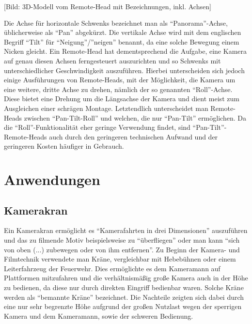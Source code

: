 \documentclass[a4paper, 12pt, bibtotocnumbered, liststotocnumbered]{scrartcl}
\begin{document}
	[Bild: 3D-Modell vom Remote-Head mit Bezeichnungen, inkl. Achsen]

	Die Achse für horizontale Schwenks bezeichnet man als “Panorama”-Achse, üblicherweise als “Pan” abgekürzt. Die vertikale Achse wird mit dem englischen Begriff “Tilt” für “Neigung”/”neigen” benannt, da eine solche Bewegung einem Nicken gleicht.
	Ein Remote-Head hat dementsprechend die Aufgabe, eine Kamera auf genau diesen Achsen ferngesteuert auszurichten und so Schwenks mit unterschiedlicher Geschwindigkeit auszuführen. Hierbei unterscheiden sich jedoch einige Ausführungen von Remote-Heads, mit der Möglichkeit, die Kamera um eine weitere, dritte Achse zu drehen, nämlich der so genannten “Roll”-Achse. Diese bietet eine Drehung um die Längsachse der Kamera und dient meist zum Ausgleichen einer schrägen Montage. Letztendlich unterscheidet man Remote-Heads zwischen “Pan-Tilt-Roll” und welchen, die nur “Pan-Tilt” ermöglichen. Da die “Roll”-Funktionalität eher geringe Verwendung findet, sind “Pan-Tilt”-Remote-Heads auch durch den geringeren technischen Aufwand und der geringeren Kosten häufiger in Gebrauch.

	\section{Anwendungen}
	\subsection{Kamerakran}
	Ein Kamerakran ermöglicht es “Kamerafahrten in drei Dimensionen” auszuführen und das zu filmende Motiv beispielsweise zu “überfliegen” oder man kann “sich von oben (...) zubewegen oder von ihm entfernen”. Zu Beginn der Kamera- und Filmtechnik verwendete man Kräne, vergleichbar mit Hebebühnen oder einem Leiterfahrzeug der Feuerwehr. Dies ermöglichte es dem Kameramann auf Plattformen mitzufahren und die verhältnismäßig große Kamera auch in der Höhe zu bedienen, da diese nur durch direkten Eingriff bedienbar waren. Solche Kräne werden als “bemannte Kräne” bezeichnet. Die Nachteile zeigten sich dabei durch eine nur sehr begrenzte Höhe aufgrund der großen Nutzlast wegen der sperrigen Kamera und dem Kameramann, sowie der schweren Bedienung.
\end{document}
